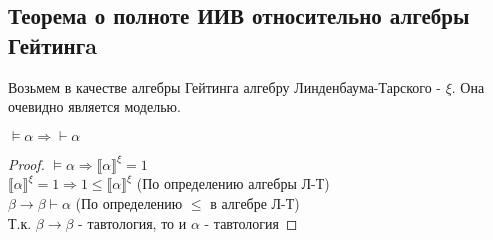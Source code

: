 \subsection{Теорема о полноте ИИВ относительно алгебры Гейтингa}
\label{sec-5-6}
Возьмем в качестве алгебры Гейтинга алгебру Линденбаума-Тарского - $\xi$. Она очевидно является моделью. 
\begin{theorem}
$\models \alpha \Rightarrow \vdash \alpha$
\end{theorem}
\begin{proof}
$\models \alpha \Rightarrow \llbracket \alpha \rrbracket ^ {\xi} = 1$\\
$\llbracket \alpha \rrbracket ^ {\xi} = 1 \Rightarrow 1 \leq \llbracket \alpha \rrbracket ^ {\xi}$ (По определению алгебры Л-Т)\\
$\beta \rightarrow \beta \vdash \alpha$ (По определению $\leq$ в алгебре Л-Т)\\
Т.к. $\beta \rightarrow \beta$ - тавтология, то и $\alpha$ - тавтология
\end{proof}
